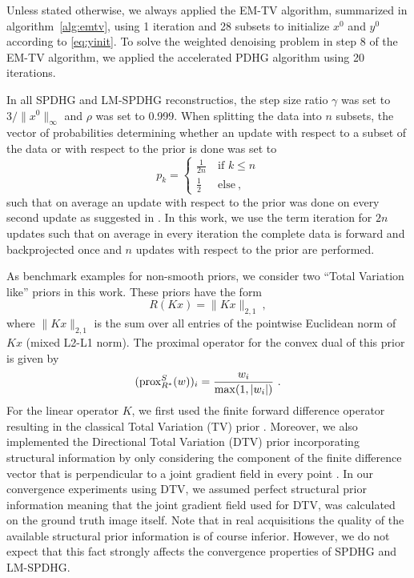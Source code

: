 Unless stated otherwise, we always applied the EM-TV algorithm, summarized in algorithm~\ref{alg:emtv}, 
using 1 iteration and 28 subsets to initialize $x^0$ and $y^0$ according to \eqref{eq:yinit}.
To solve the weighted denoising problem in step 8 of the EM-TV algorithm, we applied the
accelerated PDHG algorithm \cite{Chambolle2011} using 20 iterations.

In all SPDHG and LM-SPDHG reconstructios, the step size ratio $\gamma$ was set 
to $3 / \|x^0\|_\infty$ and $\rho$ was set to 0.999.
When splitting the data into $n$ subsets, the vector of probabilities determining 
whether an update with respect to a subset of the data or with respect to the prior is 
done was set to 
%
\begin{equation}
p_k = 
  \begin{cases}
  \frac{1}{2n} \ &\text{if } k \leq n \\
  \frac{1}{2}  \ &\text{else} \ ,
  \end{cases}
\end{equation}
%
such that on average an update with respect to the prior was done on every second update
as suggested in \cite{Ehrhardt2019}. 
In this work, we use the term iteration for $2n$ updates such that on average in every iteration
the complete data is forward and backprojected once and $n$ updates with respect to the
prior are performed.

As benchmark examples for non-smooth priors, we consider two ``Total Variation like'' priors
in this work. 
These priors have the form
%
\begin{equation}
  R(Kx) = \|K x\|_{2,1} \ ,
\end{equation}
%
where $\|K x \|_{2,1}$ is the sum over all entries of the pointwise Euclidean norm of $K x$
(mixed L2-L1 norm).
The proximal operator for the convex dual of this prior is given by
%
\begin{equation}
(\operatorname{prox}_{R^*}^S(w) )_i = \frac{w_i}{\max(1,|w_i|)} \ .
\end{equation}
%
For the linear operator $K$, we first used the finite forward difference operator resulting
in the classical Total Variation (TV) prior \cite{Rudin1992}.
Moreover, we also implemented the Directional Total Variation (DTV) prior incorporating
structural information by only considering the component of the finite difference vector 
that is perpendicular to a joint gradient field in every point \cite{Ehrhardt2016}.
In our convergence experiments using DTV, we assumed perfect structural prior information
meaning that the joint gradient field used for DTV, was calculated on the ground truth image
itself.
Note that in real acquisitions the quality of the available structural prior information is
of course inferior. 
However, we do not expect that this fact strongly affects the convergence properties of 
SPDHG and LM-SPDHG. 

